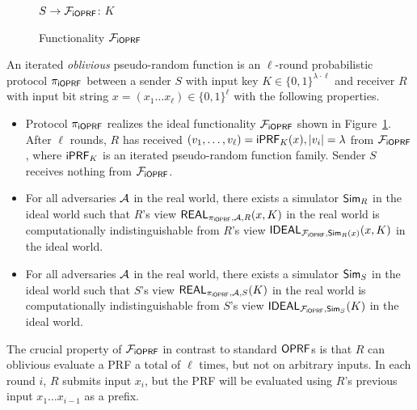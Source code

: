 \begin{figure}[tb]
\LinesNumbered
\begin{functionality}[H]
$S\rightarrow{}\mathcal{F}_{\mathsf{i}\mathsf{OPRF}}$: $K$\;
\end{functionality}
\caption{Functionality $\mathcal{F}_{\mathsf{i}\mathsf{OPRF}}$\label{idealioprf}}
\end{figure}

\begin{definition}[$\proto$]
  An iterated \emph{oblivious} pseudo-random function is an
  $\ell$-round probabilistic protocol $\proto$ between a sender $S$
  with input key $K\in\{0,1\}^{\lambda\cdot\ell}$ and receiver $R$
  with input bit string $x=(x_1\ldots{}x_\ell)\in\{0,1\}^{\ell}$ with
  the following properties.

  \begin{itemize}
   
  \item Protocol $\proto$ realizes the ideal functionality $\mathcal{F}_{\mathsf{i}\mathsf{OPRF}}$
    shown in Figure~\ref{idealioprf}. After $\ell$ rounds, $R$ has
    received $(v_1,\ldots,v_\ell)=\mathsf{i}\mathsf{PRF}_K(x),|v_i|=\lambda$ from
    $\mathcal{F}_{\mathsf{i}\mathsf{OPRF}}$, where $\mathsf{i}\mathsf{PRF}_K$ is an iterated pseudo-random function
    family. Sender $S$ receives nothing from $\mathcal{F}_{\mathsf{i}\mathsf{OPRF}}$.
  
  \item For all adversaries ${\mathcal{A}}$ in the real world, there exists a
    simulator ${\mathsf{Sim}}_R$ in the ideal world such that $R$'s view
    $\mathsf{REAL}_{{\pi_{\mathsf{i}\mathsf{OPRF}}},{\mathcal{A}},R}(x,K)$ in the real world is
    computationally indistinguishable from $R$'s view
    $\mathsf{IDEAL}_{\mathcal{F}_{\mathsf{i}\mathsf{OPRF}},{\mathsf{Sim}}_R(x)}(x,K)$ in the ideal world.

  \item For all adversaries ${\mathcal{A}}$ in the real world, there exists a
    simulator ${\mathsf{Sim}}_S$ in the ideal world such that $S$'s view
    $\mathsf{REAL}_{{\pi_{\mathsf{i}\mathsf{OPRF}}},{\mathcal{A}},S}(K)$ in the real world is
    computationally indistinguishable from $S$'s view
    $\mathsf{IDEAL}_{\mathcal{F}_{\mathsf{i}\mathsf{OPRF}},{\mathsf{Sim}}_S}(K)$ in the ideal world.
\end{itemize}
\end{definition}

The crucial property of $\mathcal{F}_{\mathsf{i}\mathsf{OPRF}}$ in contrast to standard $\mathsf{OPRF}$s is
that $R$ can oblivious evaluate a PRF a total of $\ell$ times, but not
on arbitrary inputs. In each round $i$, $R$ submits input $x_i$, but
the PRF will be evaluated using $R$'s previous input
$x_1\ldots{}x_{i-1}$ as a prefix.

